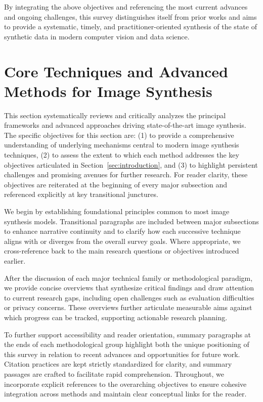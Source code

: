 \documentclass[sigconf]{acmart}
\begin{document}
By integrating the above objectives and referencing the most current advances and ongoing challenges, this survey distinguishes itself from prior works and aims to provide a systematic, timely, and practitioner-oriented synthesis of the state of synthetic data in modern computer vision and data science.

\section{Core Techniques and Advanced Methods for Image Synthesis}

This section systematically reviews and critically analyzes the principal frameworks and advanced approaches driving state-of-the-art image synthesis. The specific objectives for this section are: (1) to provide a comprehensive understanding of underlying mechanisms central to modern image synthesis techniques, (2) to assess the extent to which each method addresses the key objectives articulated in Section~\ref{sec:introduction}, and (3) to highlight persistent challenges and promising avenues for further research. For reader clarity, these objectives are reiterated at the beginning of every major subsection and referenced explicitly at key transitional junctures.

We begin by establishing foundational principles common to most image synthesis models. Transitional paragraphs are included between major subsections to enhance narrative continuity and to clarify how each successive technique aligns with or diverges from the overall survey goals. Where appropriate, we cross-reference back to the main research questions or objectives introduced earlier.

After the discussion of each major technical family or methodological paradigm, we provide concise overviews that synthesize critical findings and draw attention to current research gaps, including open challenges such as evaluation difficulties or privacy concerns. These overviews further articulate measurable aims against which progress can be tracked, supporting actionable research planning.

To further support accessibility and reader orientation, summary paragraphs at the ends of each methodological group highlight both the unique positioning of this survey in relation to recent advances and opportunities for future work. Citation practices are kept strictly standardized for clarity, and summary passages are crafted to facilitate rapid comprehension. Throughout, we incorporate explicit references to the overarching objectives to ensure cohesive integration across methods and maintain clear conceptual links for the reader.
\end{document}
